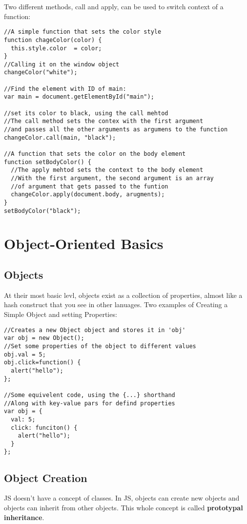 \documentclass[a4paper,11pt]{book}
\begin{document}
Two different methods, call and apply, can be used to switch context of a
function:
\begin{verbatim}
//A simple function that sets the color style
function chageColor(color) {
  this.style.color  = color;
}
//Calling it on the window object
changeColor("white");

//Find the element with ID of main:
var main = document.getElementById("main");

//set its color to black, using the call mehtod
//The call method sets the contex with the first argument
//and passes all the other arguments as argumens to the function
changeColor.call(main, "black");

//A function that sets the color on the body element
function setBodyColor() {
  //The apply mehtod sets the context to the body element
  //With the first argument, the second argument is an array
  //of argument that gets passed to the funtion
  changeColor.apply(document.body, arugments);
}
setBodyColor("black");
\end{verbatim}
\section{Object-Oriented Basics}
\subsection{Objects}
At their most basic levl, objects exist as a collection of properties, almost
like a hash construct that you see in other lanuages.
Two examples of Creating a Simple Object and setting Properties:
\begin{verbatim}
//Creates a new Object object and stores it in 'obj'
var obj = new Object();
//Set some properties of the object to different values
obj.val = 5;
obj.click=function() {
  alert("hello");
};

//Some equivelent code, using the {...} shorthand
//Along with key-value pars for defind properties
var obj = {
  val: 5;
  click: funciton() {
    alert("hello");
  }
};
\end{verbatim}
\subsection{Object Creation}
JS doesn't have a concept of classes. In JS, objects can create new objects and
objects can inherit from other objects. This whole concept is called
\textbf{prototypal inheritance}.
\end{document}
